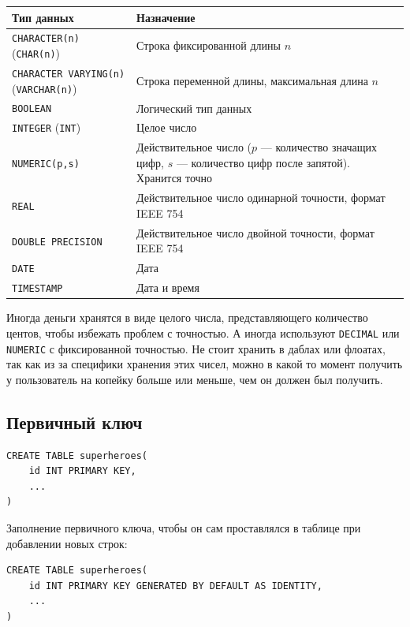 \documentclass[11pt]{article}
\begin{document}
\begin{center}
\begin{tabularx}{\linewidth}{@{}l >{\RaggedRight}X@{}}
    \toprule
    \textbf{Тип данных} & \textbf{Назначение} \\
    \midrule
    \texttt{CHARACTER(n)} (\texttt{CHAR(n)}) & Строка фиксированной длины $n$ \\
    \texttt{CHARACTER VARYING(n)} (\texttt{VARCHAR(n)}) & Строка переменной длины, максимальная длина $n$ \\
    \texttt{BOOLEAN} & Логический тип данных \\
    \texttt{INTEGER} (\texttt{INT}) & Целое число \\
    \texttt{NUMERIC(p,s)} & Действительное число ($p$ --- количество значащих цифр, $s$ --- количество цифр после запятой). Хранится точно \\
    \texttt{REAL} & Действительное число одинарной точности, формат IEEE 754 \\
    \texttt{DOUBLE PRECISION} & Действительное число двойной точности, формат IEEE 754 \\
    \texttt{DATE} & Дата \\
    \texttt{TIMESTAMP} & Дата и время \\
    \bottomrule
\end{tabularx}
\end{center}
Иногда деньги хранятся в виде целого числа, представляющего количество центов, чтобы избежать проблем с точностью. А иногда используют \texttt{DECIMAL} или \texttt{NUMERIC} с фиксированной точностью. Не стоит хранить в даблах или флоатах, так как из за специфики хранения этих чисел, можно в какой то момент получить у пользователь на копейку больше или меньше, чем он должен был получить.
\subsection{Первичный ключ}

\begin{lstlisting}
CREATE TABLE superheroes(
    id INT PRIMARY KEY,
    ...
)
\end{lstlisting}

Заполнение первичного ключа, чтобы он сам проставлялся в таблице при добавлении новых строк:

\begin{lstlisting}
CREATE TABLE superheroes(
    id INT PRIMARY KEY GENERATED BY DEFAULT AS IDENTITY,
    ...
)
\end{lstlisting}
\end{document}
